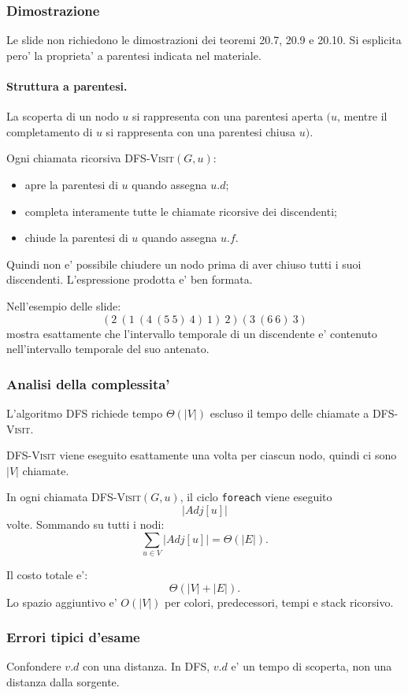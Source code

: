 \subsubsection{Dimostrazione}
Le slide non richiedono le dimostrazioni dei teoremi 20.7, 20.9 e 20.10. Si esplicita pero' la proprieta' a parentesi indicata nel materiale.

\paragraph{Struttura a parentesi.}
La scoperta di un nodo $u$ si rappresenta con una parentesi aperta $(u$, mentre il completamento di $u$ si rappresenta con una parentesi chiusa $u)$.

Ogni chiamata ricorsiva \textsc{DFS-Visit}$(G,u)$:
\begin{itemize}
	\item apre la parentesi di $u$ quando assegna $u.d$;
	\item completa interamente tutte le chiamate ricorsive dei discendenti;
	\item chiude la parentesi di $u$ quando assegna $u.f$.
\end{itemize}
Quindi non e' possibile chiudere un nodo prima di aver chiuso tutti i suoi discendenti. L'espressione prodotta e' ben formata.

Nell'esempio delle slide:
\[
(2\ (1\ (4\ (5\ 5)\ 4)\ 1)\ 2)(3\ (6\ 6)\ 3)
\]
mostra esattamente che l'intervallo temporale di un discendente e' contenuto nell'intervallo temporale del suo antenato.

\subsubsection{Analisi della complessita'}
L'algoritmo \textsc{DFS} richiede tempo $\Theta(|V|)$ escluso il tempo delle chiamate a \textsc{DFS-Visit}.

\textsc{DFS-Visit} viene eseguito esattamente una volta per ciascun nodo, quindi ci sono $|V|$ chiamate.

In ogni chiamata \textsc{DFS-Visit}$(G,u)$, il ciclo \texttt{foreach} viene eseguito
\[
|Adj[u]|
\]
volte. Sommando su tutti i nodi:
\[
\sum_{u\in V}|Adj[u]|=\Theta(|E|).
\]

Il costo totale e':
\[
\Theta(|V|+|E|).
\]
Lo spazio aggiuntivo e' $O(|V|)$ per colori, predecessori, tempi e stack ricorsivo.

\subsubsection{Errori tipici d'esame}
\begin{hardnote}
Confondere $v.d$ con una distanza. In DFS, $v.d$ e' un tempo di scoperta, non una distanza dalla sorgente.
\end{hardnote}

